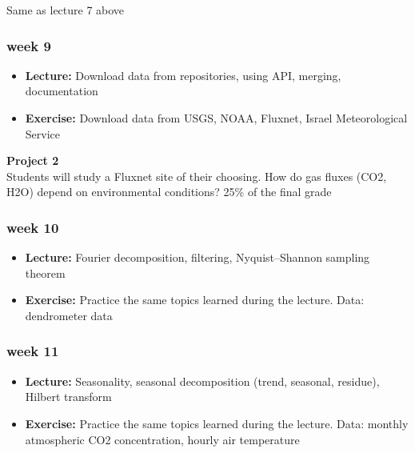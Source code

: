 \documentclass[
  letterpaper,
  DIV=11,
  numbers=noendperiod,
  oneside]{scrreprt}
\providecommand{\tightlist}{%
  \setlength{\itemsep}{0pt}\setlength{\parskip}{0pt}}\usepackage{longtable,booktabs,array}
\begin{document}
Same as lecture 7 above

\hypertarget{week-9}{%
\subsubsection*{week 9}\label{week-9}}

\begin{itemize}
\tightlist
\item
  \textbf{Lecture:} Download data from repositories, using API, merging,
  documentation
\item
  \textbf{Exercise:} Download data from USGS, NOAA, Fluxnet, Israel
  Meteorological Service
\end{itemize}

\textbf{Project 2}\\
Students will study a Fluxnet site of their choosing. How do gas fluxes
(CO2, H2O) depend on environmental conditions? 25\% of the final grade

\hypertarget{week-10}{%
\subsubsection*{week 10}\label{week-10}}

\begin{itemize}
\tightlist
\item
  \textbf{Lecture:} Fourier decomposition, filtering, Nyquist--Shannon
  sampling theorem
\item
  \textbf{Exercise:} Practice the same topics learned during the
  lecture. Data: dendrometer data
\end{itemize}

\hypertarget{week-11}{%
\subsubsection*{week 11}\label{week-11}}

\begin{itemize}
\tightlist
\item
  \textbf{Lecture:} Seasonality, seasonal decomposition (trend,
  seasonal, residue), Hilbert transform
\item
  \textbf{Exercise:} Practice the same topics learned during the
  lecture. Data: monthly atmospheric CO2 concentration, hourly air
  temperature
\end{itemize}
\end{document}
